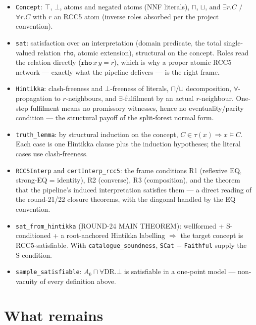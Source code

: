 \documentclass[11pt]{article}
\newcommand{\code}[1]{\texttt{#1}}
\begin{document}
\begin{itemize}[leftmargin=2em]
\item \code{Concept}: $\top$, $\bot$, atoms and negated atoms (NNF
literals), $\sqcap$, $\sqcup$, and $\exists r.C$ / $\forall r.C$ with
$r$ an RCC5 atom (inverse roles absorbed per the project convention).
\item \code{sat}: satisfaction over an interpretation (domain
predicate, the total single-valued relation \code{rho}, atomic
extension), structural on the concept.  Roles read the relation
directly ($\code{rho}\,x\,y = r$), which is why a proper atomic RCC5
network --- exactly what the pipeline delivers --- is the right frame.
\item \code{Hintikka}: clash-freeness and $\bot$-freeness of literals,
$\sqcap$/$\sqcup$ decomposition, $\forall$-propagation to
$r$-neighbours, and $\exists$-fulfilment by an actual $r$-neighbour.
One-step fulfilment means no promissory witnesses, hence no
eventuality/parity condition --- the structural payoff of the
split-forest normal form.
\item \code{truth\_lemma}: by structural induction on the concept,
$C \in \tau(x) \Rightarrow x \models C$.  Each case is one Hintikka
clause plus the induction hypotheses; the literal cases use
clash-freeness.
\item \code{RCC5Interp} and \code{certInterp\_rcc5}: the frame
conditions R1 (reflexive EQ, strong-EQ = identity), R2 (converse), R3
(composition), and the theorem that the pipeline's induced
interpretation satisfies them --- a direct reading of the round-21/22
closure theorems, with the diagonal handled by the EQ convention.
\item \code{sat\_from\_hintikka} (ROUND-24 MAIN THEOREM): wellformed +
S-conditioned + a root-anchored Hintikka labelling $\Rightarrow$ the
target concept is RCC5-satisfiable.  With \code{catalogue\_soundness},
\code{SCat} + \code{Faithful} supply the S-condition.
\item \code{sample\_satisfiable}: $A_0 \sqcap \forall\mathrm{DR}.\bot$
is satisfiable in a one-point model --- non-vacuity of every
definition above.
\end{itemize}

\section{What remains}
\end{document}

